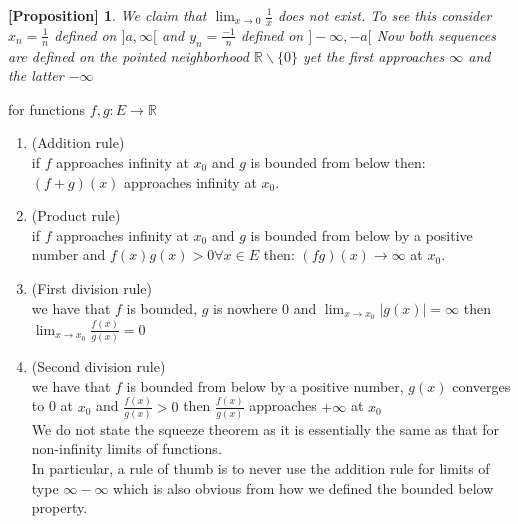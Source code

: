 \documentclass[titlepage]{article}
\newtheorem{prop}{[Proposition]}
\begin{document}
\begin{prop}
We claim that $\lim_{x \to 0} \frac{1}{x}$ does not exist. To see this consider $x_{n} = \frac{1}{n}$ defined on $]a,\infty[$ and $y_{n} = \frac{-1}{n}$ defined on $]- \infty, -a[$ Now both sequences are defined on the pointed neighborhood $\mathbb{R}\backslash \{0\}$ yet the first approaches $\infty$ and the latter $- \infty$  
\end{prop}

\begin{tcolorbox}[drop shadow, title = (Limit of functions algebra),lower separated=true]

for functions $f,g: E \to \mathbb{R}$
\begin{enumerate}
    \item (Addition rule)
    \\
    if $f$ approaches infinity at $x_{0}$ and $g$ is bounded from below then: $(f+g)(x)$ approaches infinity at $x_{0}$. 
      \item (Product rule)
    \\
    if $f$ approaches infinity at $x_{0}$ and $g$ is bounded from below by a positive number and $f(x)g(x) > 0 \forall x \in E$ then: $(fg)(x) \to \infty$ at $x_{0}$. 
    \\
    
    \item (First division rule)
    \\
    we have that $f$ is bounded, $g$ is nowhere 0 and $\lim_{x \to x_{0}}|g(x)| = \infty$ then $\lim_{x \to x_{0}} \frac{f(x)}{g(x)} = 0$
    \\
    
    \item (Second division rule)
    \\
    we have that $f$ is bounded from below by a positive number, $g(x)$ converges to 0 at $x_{0}$ and $\frac{f(x)}{g(x)} > 0$ then $\frac{f(x)}{g(x)}$ approaches $+\infty$ at $x_{0}$
    \\
    
    We do not state the squeeze theorem as it is essentially the same as that for non-infinity limits of functions. 
    \\
    
    In particular, a rule of thumb is to never use the addition rule for limits of type $ \infty - \infty$ which is also obvious from how we defined the bounded below property. 
\end{enumerate}
\\
\end{tcolorbox}
\end{document}
